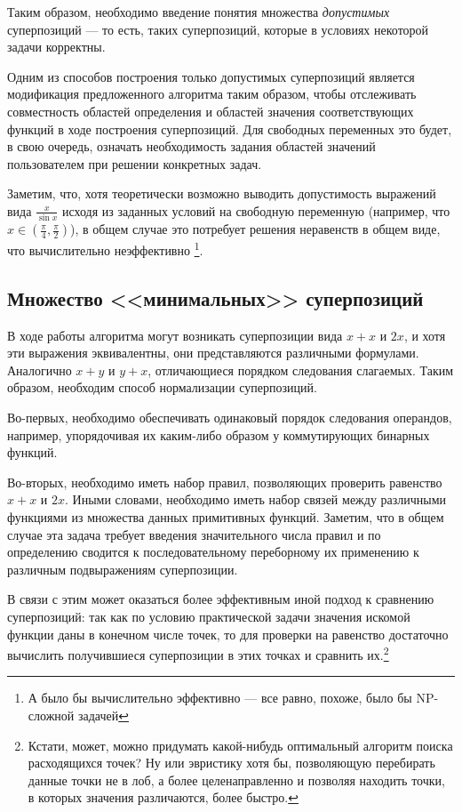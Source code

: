 \documentclass[12pt,a4paper]{amsart}
\begin{document}
Таким образом, необходимо введение понятия множества \emph{допустимых}
суперпозиций --- то есть, таких суперпозиций, которые в условиях некоторой
задачи корректны.

Одним из способов построения только допустимых суперпозиций является
модификация предложенного алгоритма таким образом, чтобы отслеживать
совместность областей определения и областей значения соответствующих
функций в ходе построения суперпозиций. Для свободных переменных это будет,
в свою очередь, означать необходимость задания областей значений пользователем
при решении конкретных задач.

Заметим, что, хотя теоретически возможно выводить допустимость выражений
вида $\frac{x}{\sin x}$ исходя из заданных условий на свободную переменную
(например, что $x \in (\frac{\pi}{4}, \frac{\pi}{2})$), в общем случае это
потребует решения неравенств в общем виде, что вычислительно неэффективно
\footnote{А было бы вычислительно эффективно --- все равно, похоже, было бы
NP-сложной задачей}.

\subsection{Множество <<минимальных>> суперпозиций}

В ходе работы алгоритма могут возникать суперпозиции вида $x + x$ и $2x$,
и хотя эти выражения эквивалентны, они представляются различными формулами.
Аналогично $x + y$ и $y + x$, отличающиеся порядком следования слагаемых.
Таким образом, необходим способ нормализации суперпозиций.

Во-первых, необходимо обеспечивать одинаковый порядок следования операндов,
например, упорядочивая их каким-либо образом у коммутирующих бинарных функций.

Во-вторых, необходимо иметь набор правил, позволяющих проверить равенство
$x + x$ и $2x$. Иными словами, необходимо иметь набор связей между различными
функциями из множества данных примитивных функций. Заметим, что в общем
случае эта задача требует введения значительного числа правил и по определению
сводится к последовательному переборному их применению к различным
подвыражениям суперпозиции.

В связи с этим может оказаться более эффективным иной подход к сравнению
суперпозиций: так как по условию практической задачи значения искомой функции
даны в конечном числе точек, то для проверки на равенство достаточно вычислить
получившиеся суперпозиции в этих точках и сравнить их.\footnote{Кстати, может,
можно придумать какой-нибудь оптимальный алгоритм поиска расходящихся точек?
Ну или эвристику хотя бы, позволяющую перебирать данные точки не в лоб, а
более целенаправленно и позволяя находить точки, в которых значения различаются,
более быстро.}
\end{document}
